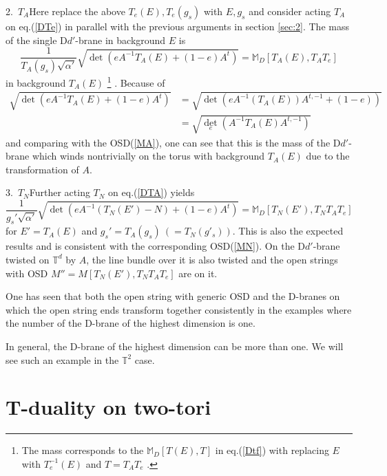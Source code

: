 \documentclass[a4paper,12pt]{article}
\newcommand{\T}{{\mathbb{T}}}
\newcommand{\M}{{\mathbb{M}}}
\newcommand{\no}{\nonumber}
\def \ov#1{\frac{1}{#1}}
\begin{document}
2.\ $T_A$\quad Here replace the above $T_e(E), T_e(g_s)$ with $E, g_s$ 
and consider acting $T_A$ on eq.(\ref{DTe}) in parallel with the 
previous arguments in section \ref{sec:2}. 
 The mass of the single D$d'$-brane in background $E$ is 
\begin{equation}
 \ov{T_A(g_s)\sqrt{\alpha'}}\sqrt{\det(eA^{-1}T_A(E)+(1-e)A^t)}
 =\M_{D}[T_A(E),T_AT_e]
 \label{DTA}
\end{equation}
in background $T_A(E)$
\footnote{The mass corresponds to the $\M_{D}[T(E),T]$ 
in eq.(\ref{Dtf}) 
with replacing $E$ with $T_e^{-1}(E)$ and $T=T_AT_e$ . }
. Because of 
\begin{equation}
 \begin{split}
 \sqrt{\det(eA^{-1}T_A(E)+(1-e)A^t)}
 &=\sqrt{\det(eA^{-1}(T_A(E))A^{t,-1}+(1-e))}\\
 &=\sqrt{{\det}_e(A^{-1}T_A(E)A^{t,-1})}
 \end{split}\no
\end{equation}
and comparing with the OSD(\ref{MA}), 
one can see that this is the mass of the D$d'$-brane which 
winds nontrivially on the torus with background $T_A(E)$ 
due to the transformation of $A$. 


3.\ $T_N$\quad Further acting $T_N$ on eq.(\ref{DTA}) yields 
\begin{equation}
 \ov{g_s'\sqrt{\alpha'}}\sqrt{\det(eA^{-1}(T_N(E')-N)+(1-e)A^t)}
 =\M_{D}[T_N(E'),T_N T_A T_e] \no
\end{equation}
for $E'=T_A(E)$ and $g_s'=T_A(g_s)\ (=T_N(g'_s))$. This is also the 
expected results and is consistent with the corresponding OSD(\ref{MN}). 
On the D$d'$-brane twisted on $\T^d$ by $A$, the line bundle over it 
is also twisted and 
the open strings with OSD $M''=M[T_N(E'),T_NT_AT_e]$ are on it. 

\vspace*{0.2cm}

One has seen that both the open string with generic OSD and 
the D-branes on which the open string ends transform together 
consistently in the examples where the number of 
the D-brane of the highest dimension is one. 

In general, the D-brane of the highest dimension can be more than one. 
We will see such an example in the $\T^2$ case.

 \section{T-duality on two-tori}
\label{sec:4}
\end{document}
